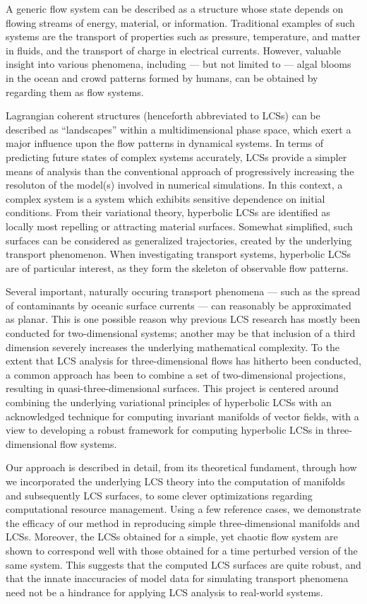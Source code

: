 \begingroup
\vspace{3mm}
A generic flow system can be described as a structure whose state depends on
flowing streams of energy, material, or information. Traditional examples of
such systems are the transport of properties such as pressure, temperature, and
matter in fluids, and the transport of charge in electrical currents. However,
valuable insight into various phenomena, including --- but not limited to ---
algal blooms in the ocean and crowd patterns formed by humans, can be obtained
by regarding them as flow systems.

Lagrangian coherent structures (henceforth abbreviated to LCSs) can be
described as ``landscapes'' within a multidimensional phase space, which exert
a major influence upon the flow patterns in dynamical systems. In terms of
predicting future states of complex systems accurately, LCSs provide a simpler
means of analysis than the conventional approach of progressively increasing
the resoluton of the model(s) involved in numerical simulations. In this
context, a complex system is a system which exhibits sensitive dependence on
initial conditions. From their variational theory, hyperbolic LCSs are
identified as locally most repelling or attracting material surfaces. Somewhat
simplified, such surfaces can be considered as generalized trajectories,
created by the underlying transport phenomenon. When investigating transport
systems, hyperbolic LCSs are of particular interest, as they form the skeleton
of observable flow patterns.

Several important, naturally occuring transport phenomena --- such as the
spread of contaminants by oceanic surface currents --- can reasonably be
approximated as planar. This is one possible reason why previous
LCS research has mostly been conducted for two-dimensional systems; another may
be that inclusion of a third dimension severely increases the underlying
mathematical complexity. To the extent that LCS analysis for three-dimensional
flows has hitherto been conducted, a common approach has been to combine a set
of two-dimensional projections, resulting in quasi-three-dimensional
surfaces. This project is centered around combining the underlying variational
principles of hyperbolic LCSs with an acknowledged technique for computing
invariant manifolds of vector fields, with a view to developing a robust
framework for computing hyperbolic LCSs in three-dimensional flow systems.

Our approach is described in detail, from its theoretical fundament, through
how we incorporated the underlying LCS theory into the computation of manifolds
and subsequently LCS surfaces, to some clever optimizations regarding
computational resource management. Using a few reference cases, we demonstrate
the efficacy of our method in reproducing simple three-dimensional manifolds
and LCSs. Moreover, the LCSs obtained for a simple, yet chaotic flow
system are shown to correspond well with those obtained for a time perturbed
version of the same system. This suggests that the computed LCS surfaces are
quite robust, and that the innate inaccuracies of model data for simulating
transport phenomena need not be a hindrance for applying LCS analysis to
real-world systems.

